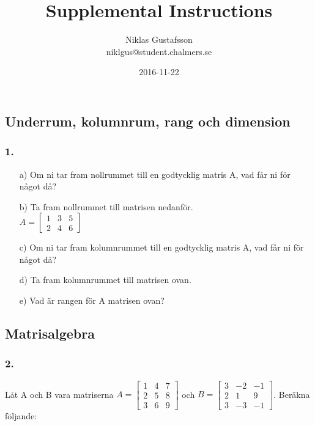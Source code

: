 \documentclass{article}
\title{Supplemental Instructions}
\author{Niklas Gustafsson \\ 
		\small{niklgus@student.chalmers.se}
}
\date{
      2016-11-22
     }
\begin{document}
\maketitle

\subsection*{Underrum, kolumnrum, rang och dimension}
\subsubsection*{1.}
\begin{itemize}
	\item[a) ] Om ni tar fram nollrummet till en godtycklig matris A, vad får ni för något då?
	\item[b) ] Ta fram nollrummet till matrisen nedanför. \\
	$A=\begin{bmatrix}1 & 3 & 5\\ 2 & 4 & 6 \end{bmatrix}$
	\item[c) ] Om ni tar fram kolumnrummet till en godtycklig matris A, vad får ni för något då?
	\item[d) ] Ta fram kolumnrummet till matrisen ovan. 
	\item[e) ] Vad är rangen för A matrisen ovan? 
\end{itemize}

\subsection*{Matrisalgebra}
\subsubsection*{2.}
Låt A och B vara matriserna $A=\begin{bmatrix}1 & 4 & 7\\ 2 & 5 & 8 \\ 3 & 6 & 9\end{bmatrix}$ och $B=\begin{bmatrix}3 & -2 & -1\\ 2 & 1 & 9 \\ 3 & -3 & -1\end{bmatrix}$. Beräkna följande:
\end{document}

